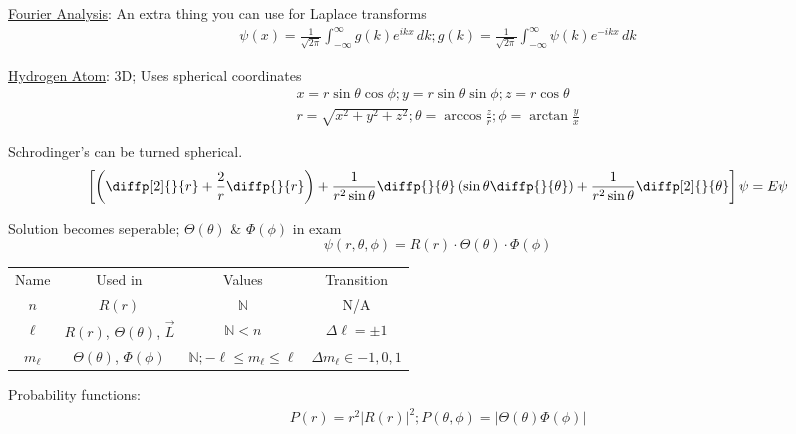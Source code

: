 \documentclass[8pt]{extarticle}
\newcommand{\e}[1]{e^{#1}}
\begin{document}
    \underline{Fourier Analysis}: An extra thing you can use for Laplace transforms
        \begin{gather*}
            \psi(x) = \frac{1}{\sqrt{2\pi}}\int_{-\infty}^{\infty} g(k) \e{ikx}\,dk;
            g(k) = \frac{1}{\sqrt{2\pi}}\int_{-\infty}^{\infty} \psi(k) \e{-ikx}\,dk
        \end{gather*}

    \underline{Hydrogen Atom}:
        3D; Uses spherical coordinates
        \begin{gather*}
            x = r \sin\theta \cos\phi; y = r \sin\theta \sin\phi; z = r \cos\theta\\
            r = \sqrt{x^2 + y^2 + z^2}; \theta = \arccos\frac{z}{r}; \phi = \arctan\frac{y}{x}
        \end{gather*}

        Schrodinger's can be turned spherical.
        \begin{equation*}
            {\left[ \left( \diffp[2]{}{r} + \frac{2}{r}\diffp{}{r} \right) + \frac{1}{r^2\sin\theta}\diffp{}{\theta}\left( \sin\theta \diffp{}{\theta} \right) + \frac{1}{r^2\sin\theta}\diffp[2]{}{\theta}\right]\psi = E\psi}
        \end{equation*}

        Solution becomes seperable; $\Theta(\theta)$ \& $\Phi(\phi)$ in exam
        \begin{equation*}
            \psi(r,\theta,\phi) = R(r) \cdot \Theta(\theta) \cdot \Phi(\phi)
        \end{equation*}

        \begin{tabular}{c | c | c | c}
            Name        & Used in   &   Values & Transition\\
            $n$         & $R(r)$    &   $\mathbb{N}$ & N/A\\
            $\ell$      & $R(r)$, $\Theta(\theta)$, $\vec{L}$  &   $\mathbb{N} < n$ & $\Delta \ell = \pm 1$\\
            $m_\ell$    & $\Theta(\theta)$, $\Phi(\phi)$    &   $\mathbb{N}; -\ell \leq m_\ell \leq \ell$ & $\Delta m_\ell \in {-1,0,1}$
        \end{tabular}

        Probability functions:
        \begin{gather*}
            P(r) = r^2 \left| R(r) \right|^2; 
            P(\theta, \phi) = \left| \Theta(\theta) \Phi(\phi) \right|
        \end{gather*}
\end{document}

